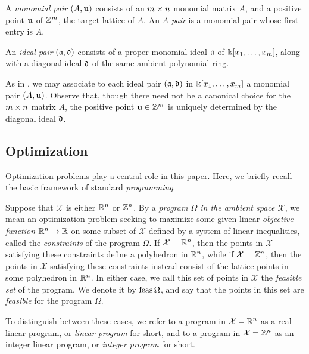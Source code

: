 \documentclass{amsart}
\begin{document}
\begin{definition}[Pairs]
\label{pairs: D}
   A \emph{monomial pair} $(A, \mathbf{u})$ consists of an $m \times n$ monomial matrix $A$, and a positive point $\mathbf{u}$ of $\mathbb{Z}^m$, the target lattice of $A$.
    An \emph{$A$-pair} is a monomial pair whose first entry is $A$.

   An \emph{ideal pair} $(\mathfrak{a}, \mathfrak{d})$ consists of a proper monomial ideal $\mathfrak{a}$ of $\Bbbk[x_1, \ldots, x_{m}]$, along with a diagonal ideal $\mathfrak{d}$ of the same ambient polynomial ring.
\end{definition}

\begin{remark}
\label{associate of pairs: R}
 As in , we may associate to each ideal pair $(\mathfrak{a}, \mathfrak{d})$ in $\Bbbk[x_1, \ldots, x_{m}]$ a monomial pair $(A, \mathbf{u})$.  Observe that, though there need not be a canonical choice for the $m \times n$ matrix $A$, the positive point $\mathbf{u} \in \mathbb{Z}^m$ is uniquely determined by the diagonal ideal $\mathfrak{d}$.
\end{remark}

\subsection{Optimization} \label{optimization: S}  Optimization problems play a central role in this paper.  Here, we briefly recall the basic framework of standard \emph{programming}.

Suppose that $\mathcal{X}$ is either $\mathbb{R}^n$ or $\mathbb{Z}^n$.  By a \emph{program $\Omega$ in the ambient space $\mathcal{X}$}, we mean an optimization problem seeking to maximize some given linear \emph{objective function} $\mathbb{R}^n \to \mathbb{R}$ on some subset of $\mathcal{X}$ defined by a system of linear inequalities, called the \emph{constraints} of the program $\Omega$. If $\mathcal{X} = \mathbb{R}^n$, then the points in $\mathcal{X}$ satisfying these constraints define a polyhedron in $\mathbb{R}^n$, while if $\mathcal{X} = \mathbb{Z}^n$, then the points in $\mathcal{X}$ satisfying these constraints instead consist of the lattice points in some polyhedron in $\mathbb{R}^n$.  In either case, we call this set of points in $\mathcal{X}$ the \emph{feasible set} of the program.  We denote it by $\operatorname{feas} \Omega$, and say that the points in this set are \emph{feasible} for the program $\Omega$.

To distinguish between these cases, we refer to a program in $\mathcal{X} = \mathbb{R}^n$ as a {real linear program}, or \emph{linear program} for short, and to a program in $\mathcal{X}=\mathbb{Z}^n$ as an {integer linear program}, or \emph{integer program} for short.
\end{document}
